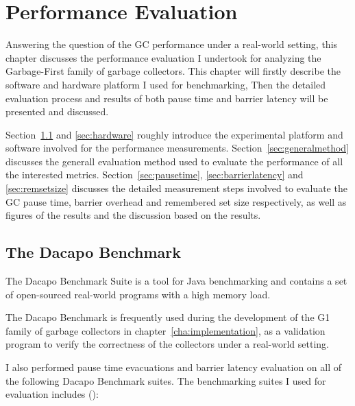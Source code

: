 \chapter{Performance Evaluation}
\label{cha:evaluation}

Answering the question of the GC performance under a real-world setting,
this chapter discusses the performance evaluation I undertook for analyzing
the Garbage-First family of garbage collectors. This chapter will firstly describe the software and hardware platform I used for benchmarking,
Then the detailed evaluation process and results of both pause time and
barrier latency will be presented and discussed.

Section~\ref{sec:dacapo} and \ref{sec:hardware} roughly introduce the experimental
platform and software involved for the performance measurements.
Section~\ref{sec:generalmethod} discusses the generall evaluation method used to
evaluate the performance of all the interested metrics.
Section~\ref{sec:pausetime}, \ref{sec:barrierlatency} and \ref{sec:remsetsize} discusses the detailed
measurement steps involved to evaluate the GC pause time, barrier overhead and remembered set size
respectively, as well
as figures of the results and the discussion based on the results.

\section{The Dacapo Benchmark} %
\label{sec:dacapo}

The Dacapo Benchmark Suite is a tool for Java benchmarking and contains a set of
open-sourced real-world programs with a high memory load.

The Dacapo Benchmark is frequently used during the development of the G1 family
of garbage collectors in chapter~\ref{cha:implementation}, as a validation program
to verify the correctness of the collectors under a real-world setting.

I also performed pause time evacuations and barrier latency evaluation
on all of the following Dacapo Benchmark suites.
The benchmarking suites I used for evaluation includes (\cite{Blackburn:2006:DBJ:1167515.1167488}):

